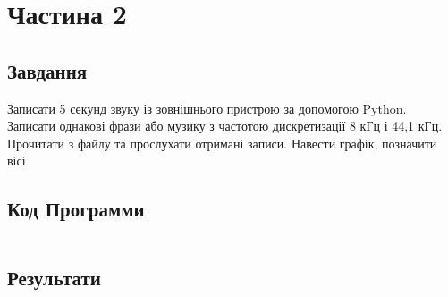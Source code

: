 \section{Частина 2}
\label{sec:task2}

\subsection{Завдання}
\label{subsec:task2_task}

Записати 5 секунд звуку із зовнішнього пристрою за допомогою Python. \\
Записати однакові фрази або музику з частотою дискретизації 8 кГц і 44,1 кГц. \\
Прочитати з файлу та прослухати отримані записи. Навести графік, позначити вісі

\subsection{Код Программи}
\label{subsec:task2_code}
\inputminted{python}{../src/task2.py}

\subsection{Результати}
\label{subsec:task2_results}
